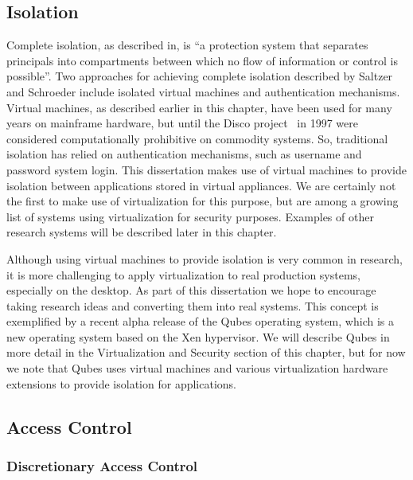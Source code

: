 
\subsection{Isolation}

Complete isolation, as described in\cite{saltzer_1975}, is ``a protection system that separates principals into compartments between which no flow of information or control is possible''. Two approaches for achieving complete isolation described by Saltzer and Schroeder include isolated virtual machines and authentication mechanisms. Virtual machines, as described earlier in this chapter, have been used for many years on mainframe hardware, but until the Disco project~\cite{bugnion_1997} in 1997 were considered computationally prohibitive on commodity systems. So, traditional isolation has relied on authentication mechanisms, such as username and password system login. This dissertation makes use of virtual machines to provide isolation between applications stored in virtual appliances. We are certainly not the first to make use of virtualization for this purpose, but are among a growing list of systems using virtualization for security purposes. Examples of other research systems will be described later in this chapter. 

Although using virtual machines to provide isolation is very common in research, it is more challenging to apply virtualization to real production systems, especially on the desktop. As part of this dissertation we hope to encourage taking research ideas and converting them into real systems. This concept is exemplified by a recent alpha release of the Qubes operating system\cite{qubes-os_2010}, which is a new operating system based on the Xen hypervisor. We will describe Qubes in more detail in the Virtualization and Security section of this chapter, but for now we note that Qubes uses virtual machines and various virtualization hardware extensions to provide isolation for applications.

\subsection{Access Control}

\subsubsection{Discretionary Access Control}


